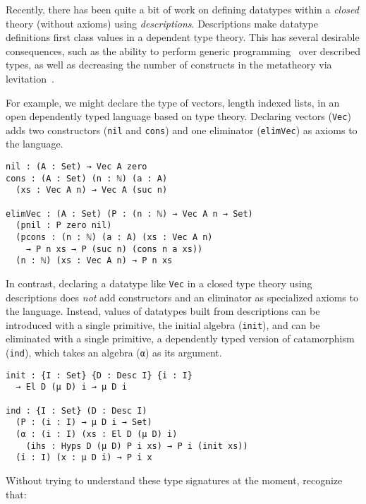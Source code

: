 \documentclass[preprint,nonatbib]{sigplanconf}
\begin{document}

Recently, there has been quite a bit of work on defining datatypes
within a {\it closed}
theory (without axioms) using {\it descriptions}.
Descriptions make datatype definitions first class values in a
dependent type theory. This has several desirable consequences, such as the
ability to perform generic programming~\citep{Chapman:2010:GAL:1932681.1863547,mcbride2010ornamental,dagand:phd}
over described types, as well as decreasing the number of constructs in the
metatheory via
levitation~\citep{Chapman:2010:GAL:1932681.1863547,dagand:phd}. 

For example, we might declare the type of vectors, length indexed
lists, in an open dependently typed language based on
\citet{martin1975intuitionistic} type theory.
Declaring vectors ({\tt Vec})
adds two constructors ({\tt nil} and {\tt cons}) and one
eliminator ({\tt elimVec}) as axioms to the language.

\begin{verbatim}
nil : (A : Set) → Vec A zero
cons : (A : Set) (n : ℕ) (a : A)
  (xs : Vec A n) → Vec A (suc n)

elimVec : (A : Set) (P : (n : ℕ) → Vec A n → Set)
  (pnil : P zero nil)
  (pcons : (n : ℕ) (a : A) (xs : Vec A n)
    → P n xs → P (suc n) (cons n a xs))
  (n : ℕ) (xs : Vec A n) → P n xs
\end{verbatim}

In contrast, declaring a datatype like {\tt Vec} in a closed type
theory using descriptions does {\it not} add constructors and an
eliminator as specialized axioms to the language. Instead, values of
datatypes built from descriptions can be introduced with a single
primitive, the initial algebra ({\tt init}), and can be eliminated with
a single primitive, a dependently typed version of catamorphism
({\tt ind}), which takes an algebra ({\tt α}) as its argument.

\begin{verbatim}
init : {I : Set} {D : Desc I} {i : I}
  → El D (μ D) i → μ D i

ind : {I : Set} (D : Desc I)
  (P : (i : I) → μ D i → Set)
  (α : (i : I) (xs : El D (μ D) i)
    (ihs : Hyps D (μ D) P i xs) → P i (init xs))
  (i : I) (x : μ D i) → P i x
\end{verbatim}

Without trying to understand these type signatures at the moment,
recognize that:
\end{document}
